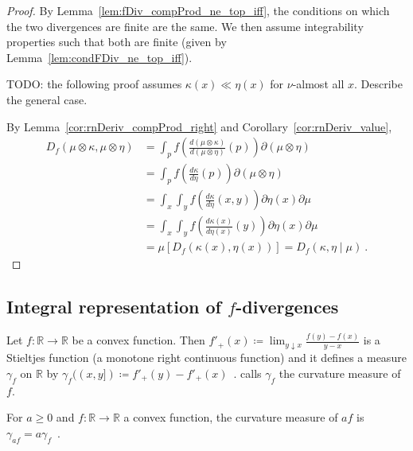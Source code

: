 \begin{proof} \leanok
{}
By Lemma~\ref{lem:fDiv_compProd_ne_top_iff}, the conditions on which the two divergences are finite are the same. We then assume integrability properties such that both are finite (given by Lemma~\ref{lem:condFDiv_ne_top_iff}).

TODO: the following proof assumes $\kappa(x) \ll \eta(x)$ for $\nu$-almost all $x$. Describe the general case.

By Lemma~\ref{cor:rnDeriv_compProd_right} and Corollary~\ref{cor:rnDeriv_value},
\begin{align*}
D_f(\mu \otimes \kappa, \mu \otimes \eta)
&= \int_{p} f\left(\frac{d (\mu \otimes \kappa)}{d (\mu \otimes \eta)}(p)\right) \partial(\mu \otimes \eta)
\\
&= \int_{p} f\left(\frac{d \kappa}{d \eta}(p)\right) \partial(\mu \otimes \eta)
\\
&= \int_x \int_y f\left(\frac{d \kappa}{d \eta}(x, y)\right) \partial \eta(x) \partial \mu
\\
&= \int_x \int_y f\left(\frac{d \kappa(x)}{d \eta(x)}(y)\right) \partial \eta(x) \partial \mu
\\
&= \mu\left[D_f(\kappa(x), \eta(x))\right]
= D_f(\kappa, \eta \mid \mu)
\: .
\end{align*}
\end{proof}



\subsection{Integral representation of $f$-divergences}


\begin{definition}
  \label{def:curvatureMeasure}
  \leanok
  \uses{}
  Let $f: \mathbb{R} \to \mathbb{R}$ be a convex function. Then $f'_+(x) \coloneqq \lim_{y \downarrow x}\frac{f(y) - f(x)}{y - x}$ is a Stieltjes function (a monotone right continuous function) and it defines a measure $\gamma_f$ on $\mathbb{R}$ by $\gamma_f((x,y]) \coloneqq f'_+(y) - f'_+(x)$~. \cite{liese2012phi} calls $\gamma_f$ the curvature measure of $f$.
\end{definition}

\begin{lemma}
  \label{lem:curvatureMeasure_mul}
  For $a \ge 0$ and $f: \mathbb{R} \to \mathbb{R}$ a convex function, the curvature measure of $af$ is $\gamma_{af} = a \gamma_f$~.
\end{lemma}

